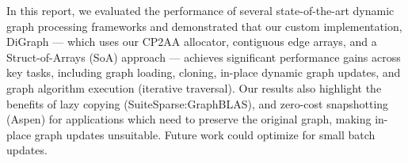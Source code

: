 In this report, we evaluated the performance of several state-of-the-art dynamic graph processing frameworks and demonstrated that our custom implementation, DiGraph --- which uses our CP2AA allocator, contiguous edge arrays, and a Struct-of-Arrays (SoA) approach --- achieves significant performance gains across key tasks, including graph loading, cloning, in-place dynamic graph updates, and graph algorithm execution (iterative traversal). Our results also highlight the benefits of lazy copying (SuiteSparse:GraphBLAS), and zero-cost snapshotting (Aspen) for applications which need to preserve the original graph, making in-place graph updates unsuitable. Future work could optimize for small batch updates.
